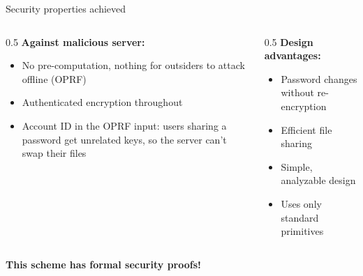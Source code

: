 \ifdefined\PRESENTATION\else\PassOptionsToClass{handout}{beamer}\fi\documentclass[aspectratio=169, lualatex]{beamer}
\begin{document}
\begin{frame}{Security properties achieved}
	\begin{columns}[c]
		\begin{column}{0.5\textwidth}
			\textbf{Against malicious server:}
			\begin{itemize}
				\item[\textcolor{green}{\mycheckmark}] No pre-computation, nothing for outsiders to attack offline (OPRF)
				\item[\textcolor{green}{\mycheckmark}] Authenticated encryption throughout
				\item[\textcolor{green}{\mycheckmark}] Account ID in the OPRF input: users sharing a password get unrelated keys, so the server can't swap their files
			\end{itemize}
		\end{column}
		\begin{column}{0.5\textwidth}
			\textbf{Design advantages:}
			\begin{itemize}
				\item[\textcolor{green}{\mycheckmark}] Password changes without re-encryption
				\item[\textcolor{green}{\mycheckmark}] Efficient file sharing
				\item[\textcolor{green}{\mycheckmark}] Simple, analyzable design
				\item[\textcolor{green}{\mycheckmark}] Uses only standard primitives
			\end{itemize}
		\end{column}
	\end{columns}
	\vspace{0.5cm}
	\begin{center}
		\textbf{This scheme has formal security proofs!}
	\end{center}
\end{frame}
\end{document}
